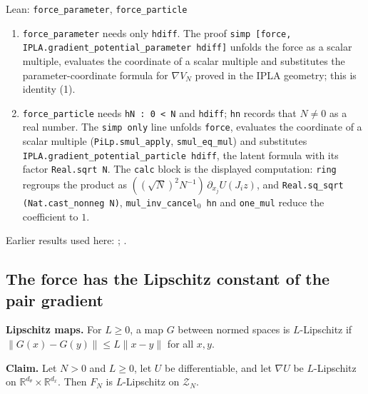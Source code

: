\documentclass[11pt,a4paper]{report}
\begin{document}
\begin{leanbox}{Lean: \texttt{force\_\allowbreak{}parameter}, \texttt{force\_\allowbreak{}particle}}
\begin{enumerate}
\item \texttt{force\_\allowbreak{}parameter} needs only \texttt{hdiff}. The proof \texttt{simp [force, IPLA.\allowbreak{}gradient\_\allowbreak{}potential\_\allowbreak{}parameter hdiff]} unfolds the force as a scalar multiple, evaluates the coordinate of a scalar multiple and substitutes the parameter-coordinate formula for \(\nabla V_N\) proved in the IPLA geometry; this is identity (1).

\item \texttt{force\_\allowbreak{}particle} needs \texttt{h\allowbreak{}N : 0 < N} and \texttt{hdiff}; \texttt{hn} records that \(N\ne0\) as a real number. The \texttt{simp only} line unfolds \texttt{force}, evaluates the coordinate of a scalar multiple (\texttt{Pi\allowbreak{}Lp.\allowbreak{}smul\_\allowbreak{}apply}, \texttt{smul\_\allowbreak{}eq\_\allowbreak{}mul}) and substitutes \texttt{IPLA.\allowbreak{}gradient\_\allowbreak{}potential\_\allowbreak{}particle hdiff}, the latent formula with its factor \texttt{Real.\allowbreak{}sqrt N}. The \texttt{calc} block is the displayed computation: \texttt{ring} regroups the product as \(((\sqrt N)^2N^{-1})\,\partial_{x_j}U(J_iz)\), and \texttt{Real.\allowbreak{}sq\_\allowbreak{}sqrt (Nat.\allowbreak{}cast\_\allowbreak{}nonneg N)}, \texttt{mul\_\allowbreak{}inv\_\allowbreak{}cancel\ensuremath{{}_{0}} hn} and \texttt{one\_\allowbreak{}mul} reduce the coefficient to \(1\).

\end{enumerate}
\end{leanbox}


Earlier results used here: \cite[Section~3.1.1]{LangevinLean2026IPLA}; \cite[Section~3.1.5]{LangevinLean2026IPLA}.
\subsection{\texorpdfstring{The force has the Lipschitz constant of the pair gradient}{The force has the Lipschitz constant of the pair gradient}}
\label{report-step-KIPLMC-Geometry-lean-5}


\textbf{Lipschitz maps.} For \(L\ge0\), a map \(G\) between normed spaces is \(L\)-Lipschitz if \(\|G(x)-G(y)\|\le L\|x-y\|\) for all \(x,y\).




\textbf{Claim.} Let \(N>0\) and \(L\ge0\), let \(U\) be differentiable, and let \(\nabla U\) be \(L\)-Lipschitz on \(\mathbb R^{d_\theta}\times\mathbb R^{d_x}\). Then \(F_N\) is \(L\)-Lipschitz on \(\mathcal Z_N\).
\end{document}
